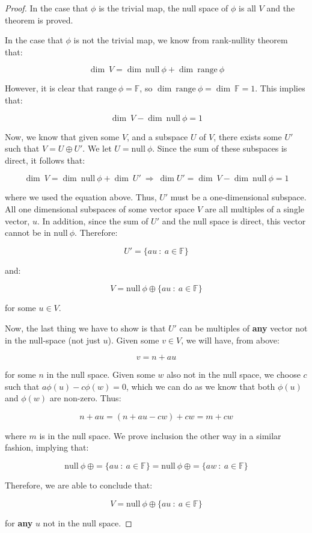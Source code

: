 \documentclass[10pt, oneside]{article}
\begin{document}
    \begin{proof}

      In the case that $\phi$ is the trivial map, the null space of $\phi$ is all $V$ and the theorem is proved.
      \newline

      In the case that $\phi$ is not the trivial map, we know from rank-nullity theorem that:

      $$\dim \ V = \dim \ \text{null} \ \phi + \dim \ \text{range} \ \phi$$

      However, it is clear that $\text{range} \ \phi = \mathbb{F}$, so $\dim \ \text{range} \ \phi = \dim \ \mathbb{F} = 1$. This
      implies that:

      $$\dim \ V - \dim \ \text{null} \ \phi = 1$$

      Now, we know that given some $V$, and a subspace $U$ of $V$, there exists some $U'$ such that $V = U \oplus U'$.
      We let $U = \text{null} \ \phi$.
      Since the sum
      of these subspaces is direct, it follows that:

      $$\dim \ V = \dim \ \text{null} \ \phi + \dim \ U' \ \Rightarrow \ \dim U' = \dim \ V - \dim \ \text{null} \ \phi = 1$$

      where we used the equation above. Thus, $U'$ must be a one-dimensional subspace. All one dimensional subspaces
      of some vector space $V$ are all multiples of a single vector, $u$. In addition, since the sum of $U'$ and the null space is direct,
      this vector cannot be in $\text{null} \ \phi$. Therefore:

      $$U' = \{au \ : \ a \in \mathbb{F}\}$$

      and:

      $$V = \text{null} \ \phi \oplus \{au \ : \ a \in \mathbb{F}\}$$

      for some $u \in V$.
      \newline

      Now, the last thing we have to show is that $U'$ can be multiples of \textbf{any} vector not in the null-space (not just $u$).
      Given some $v \in V$, we will have, from above:

      $$v = n + au$$

      for some $n$ in the null space. Given some $w$ also not in the null space, we choose $c$ such that $a \phi(u) - c \phi(w) = 0$, which
      we can do as we know that both $\phi(u)$ and $\phi(w)$ are non-zero. Thus:

      $$n + au = (n + au - cw) + cw = m + cw$$

      where $m$ is in the null space. We prove inclusion the other way in a similar fashion, implying that:

      $$\text{null} \ \phi \ \oplus = \{au \ : \ a \in \mathbb{F}\} = \text{null} \ \phi \ \oplus = \{aw \ : \ a \in \mathbb{F}\}$$

      Therefore, we are able to conclude that:

      $$V = \text{null} \ \phi \oplus \{au \ : \ a \in \mathbb{F}\}$$

      for \textbf{any} $u$ not in the null space.
      

   \end{proof}
\end{document}
